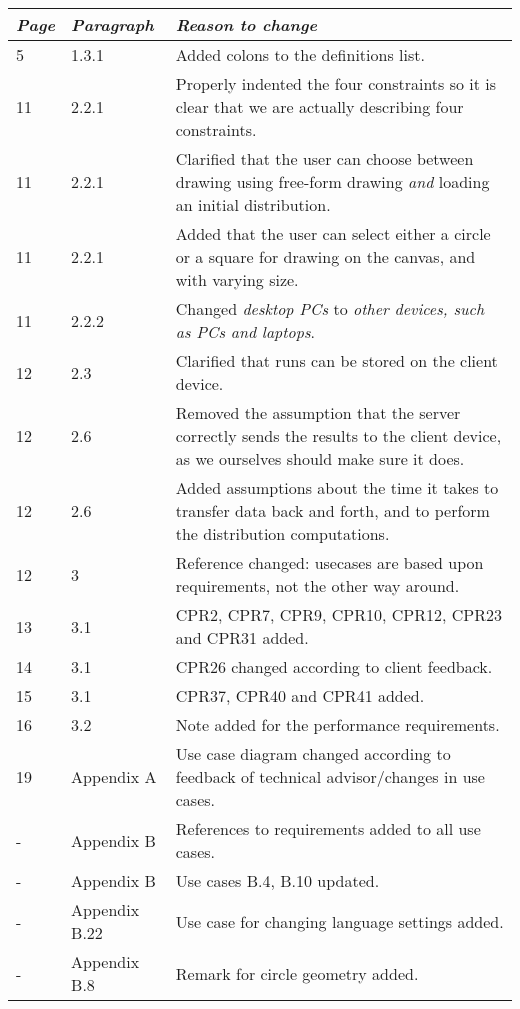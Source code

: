 \begin{longtable}{@{}llX@{}}
    \toprule
    \emph{Page} & \emph{Paragraph} & \emph{Reason to change}\\
    \midrule[1pt]
    \endhead
    5 & 1.3.1 & Added colons to the definitions list. \\
    11 & 2.2.1 & Properly indented the four constraints so it is clear that we are actually describing four constraints.\\
    11 & 2.2.1 & Clarified that the user can choose between drawing using free-form drawing \emph{and} loading an initial distribution.\\
    11 & 2.2.1 & Added that the user can select either a circle or a square for drawing on the canvas, and with varying size.\\
    11 & 2.2.2 & Changed \emph{desktop PCs} to \emph{other devices, such as PCs and laptops}.\\
    12 & 2.3   & Clarified that runs can be stored on the client device.\\ 
    12 & 2.6   & Removed the assumption that the server correctly sends the results to the client device, as we ourselves should make sure it does.\\
    12 & 2.6   & Added assumptions about the time it takes to transfer data back and forth, and to perform the distribution computations.\\
    12 & 3 & Reference changed: usecases are based upon requirements, not the other way around. \\
    13 & 3.1 & CPR2, CPR7, CPR9, CPR10, CPR12, CPR23 and CPR31 added.\\
    14 & 3.1 & CPR26 changed according to client feedback.\\
    15 & 3.1 & CPR37, CPR40 and CPR41 added.\\
    16 & 3.2 & Note added for the performance requirements.\\
    19 & Appendix A & Use case diagram changed according to feedback of technical advisor/changes in use cases.\\
    - & Appendix B & References to requirements added to all use cases.\\
    - & Appendix B & Use cases B.4, B.10 updated.\\
    - & Appendix B.22 & Use case for changing language settings added.\\
    - & Appendix B.8 & Remark for circle geometry added.\\
    \bottomrule
\end{longtable}